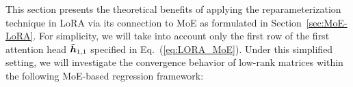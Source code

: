 

This section presents the theoretical benefits of applying the reparameterization technique in LoRA via its connection to MoE as formulated in Section~\ref{sec:MoE-LoRA}. For simplicity, we will take into account only the first row of the first attention head $\tilde{{\bm h}}_{1, 1}$ specified in Eq.~(\ref{eq:LORA_MoE}). Under this simplified setting, we will investigate the convergence behavior of low-rank matrices within the following MoE-based regression framework:

